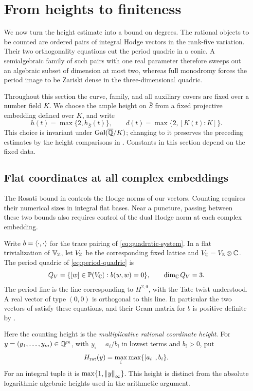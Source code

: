 \section{From heights to finiteness}\label{sec:counting}

We now turn the height estimate into a bound on degrees.  The rational
objects to be counted are ordered pairs of integral Hodge vectors in the
rank-five variation.  Their two orthogonality equations cut the period
quadric in a conic.  A semialgebraic family of such pairs with one real
parameter therefore sweeps out an algebraic subset of dimension at most
two, whereas full monodromy forces the period image to be Zariski dense
in the three-dimensional quadric.

Throughout this section the curve, family, and all auxiliary covers are
fixed over a number field $K$.  We choose the ample height on $\bar S$
from a fixed projective embedding defined over $K$, and write
\[
 h(t)=\max\{2,h_{\bar S}(t)\},\qquad
 d(t)=\max\{2,[K(t):K]\}.
\]
This choice is invariant under $\operatorname{Gal}(\overline{\mathbb Q}/K)$; changing to it preserves
the preceding estimates by the height comparisons in
.  Constants in this section depend on the fixed
data.

\subsection{Flat coordinates at all complex embeddings}

The Rosati bound in  controls the Hodge norms
of our vectors.  Counting requires their numerical sizes in integral flat
bases.  Near a puncture, passing between these two bounds also requires
control of the dual Hodge norm at each complex embedding.

Write $b=\left\langle\cdot,\cdot\right\rangle$ for the trace pairing of
\eqref{eq:quadratic-system}.  In a flat trivialization of
$\mathbb V_{\mathbb Z}$, let $V_{\mathbb Z}$ be the corresponding fixed lattice and
$V_{\mathbb C}=V_{\mathbb Z}\otimes\mathbb C$.  The period quadric of
\eqref{eq:period-quadric} is
\[
 Q_V=\{[w]\in\mathbb P(V_{\mathbb C}):b(w,w)=0\},
 \qquad \dim_{\mathbb C}Q_V=3.
\]
The period line is the line corresponding to $H^{2,0}$, with the Tate
twist understood.  A real vector of type $(0,0)$ is orthogonal to this
line.  In particular the two vectors of  satisfy
these equations, and their Gram matrix for $b$ is positive definite by
.

Here the counting height is the \emph{multiplicative rational coordinate
height}.  For $y=(y_1,\ldots,y_m)\in\mathbb Q^m$, with
$y_i=a_i/b_i$ in lowest terms and $b_i>0$, put
\[
 H_{\mathrm{rat}}(y)=\max_i\max\{\left\lvert a_i\right\rvert,b_i\}.
\]
For an integral tuple it is $\max\{1,\left\lVert y\right\rVert_{\infty}\}$.  This height
is distinct from the absolute logarithmic algebraic heights used in the
arithmetic argument.

